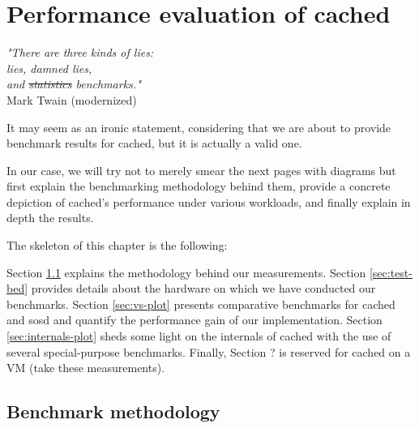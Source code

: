 \chapter{Performance evaluation of cached}\label{ch:cached-evaluation}

\begin{flushright}
	\textit{"There are three kinds of lies:\\
		lies, damned lies, \\
		and \sout{statistics} benchmarks."}	\\

	Mark Twain (modernized)
\end{flushright}

It may seem as an ironic statement, considering that we are about to provide 
benchmark results for cached, but it is actually a valid one.
\begin{comment}
What Mr.  Twain tries to say here
\footnote{
	and that's a phrase usually not heard in programming contexts...
}
is that the presentation of partials facts for something can be used to 
fabricate a plausible truth for it.
In science's case, it so often happens that promising results for an experiment 
can seem more important to the researcher's eye than negative ones due to 
positive reinforcement.
\end{comment}
In our case, we will try not to merely smear the next pages with diagrams but 
first explain the benchmarking methodology behind them, provide a concrete 
depiction of cached's performance under various workloads, and finally explain 
in depth the results.

The skeleton of this chapter is the following:

Section \ref{sec:perf-meth} explains the methodology behind our measurements.  
Section \ref{sec:test-bed} provides details about the hardware on which we have 
conducted our benchmarks.  Section \ref{sec:vs-plot} presents comparative 
benchmarks for cached and sosd and quantify the performance gain of our 
implementation. Section \ref{sec:internals-plot} sheds some light on the 
internals of cached with the use of several special-purpose benchmarks.  
Finally, Section ?  is reserved for cached on a VM (\fixme take these 
measurements).

\section{Benchmark methodology}\label{sec:perf-meth}

